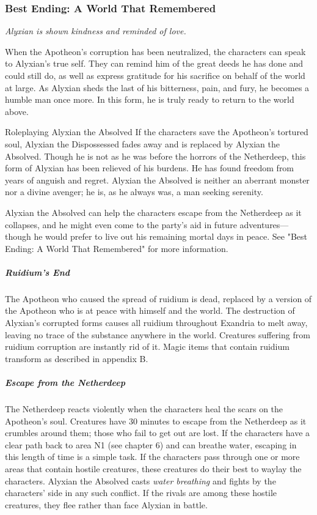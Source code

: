 \documentclass[10pt,a4paper,twoside,fancy,bg=print,twocolumn,openany,nodeprecatedcode]{dndbook}
\begin{document}
\subsubsection{Best Ending: A World That Remembered}
\textit{Alyxian is shown kindness and reminded of love.}

When the Apotheon's corruption has been neutralized, the characters can speak to Alyxian's true self. They can remind him of the great deeds he has done and could still do, as well as express gratitude for his sacrifice on behalf of the world at large. As Alyxian sheds the last of his bitterness, pain, and fury, he becomes a humble man once more. In this form, he is truly ready to return to the world above.

\begin{DndSidebar}[float=!b]{Roleplaying Alyxian the Absolved}
If the characters save the Apotheon's tortured soul, Alyxian the Dispossessed fades away and is replaced by Alyxian the Absolved. Though he is not as he was before the horrors of the Netherdeep, this form of Alyxian has been relieved of his burdens. He has found freedom from years of anguish and regret. Alyxian the Absolved is neither an aberrant monster nor a divine avenger; he is, as he always was, a man seeking serenity.



Alyxian the Absolved can help the characters escape from the Netherdeep as it collapses, and he might even come to the party's aid in future adventures—though he would prefer to live out his remaining mortal days in peace. See "Best Ending: A World That Remembered" for more information.



\end{DndSidebar}

\subparagraph{Ruidium's End}
The Apotheon who caused the spread of ruidium is dead, replaced by a version of the Apotheon who is at peace with himself and the world. The destruction of Alyxian's corrupted forms causes all ruidium throughout Exandria to melt away, leaving no trace of the substance anywhere in the world. Creatures suffering from ruidium corruption are instantly rid of it. Magic items that contain ruidium transform as described in appendix B.

\subparagraph{Escape from the Netherdeep}
The Netherdeep reacts violently when the characters heal the scars on the Apotheon's soul. Creatures have 30 minutes to escape from the Netherdeep as it crumbles around them; those who fail to get out are lost. If the characters have a clear path back to area N1 (see chapter 6) and can breathe water, escaping in this length of time is a simple task. If the characters pass through one or more areas that contain hostile creatures, these creatures do their best to waylay the characters. Alyxian the Absolved casts \textit{water breathing} and fights by the characters' side in any such conflict. If the rivals are among these hostile creatures, they flee rather than face Alyxian in battle.
\end{document}
